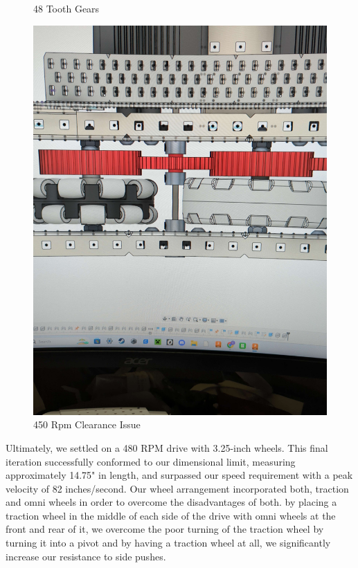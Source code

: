 \begin{figure} [htb!]
\begin{minipage}{.5\textwidth}
        \caption{48 Tooth Gears}
        \label{fig:48t-gears-=-too-long}
    \end{minipage}
    \begin{minipage}{.5\textwidth}
        \centering
        \includegraphics[width=.8\linewidth]{images/450 on 3.25 issue.jpg}
        \caption{450 Rpm Clearance Issue}
        \label{fig:450-on-3.25-issue}
    \end{minipage}
\end{figure}
Ultimately, we settled on a 480 RPM drive with 3.25-inch wheels. This final iteration successfully conformed to our dimensional limit, measuring approximately 14.75" in length, and surpassed our speed requirement with a peak velocity of 82 inches/second. Our wheel arrangement incorporated both, traction and omni wheels in order to overcome the disadvantages of both. by placing a traction wheel in the middle of each side of the drive with omni wheels at the front and rear of it, we overcome the poor turning of the traction wheel by turning it into a pivot and by having a traction wheel at all, we significantly increase our resistance to side pushes. 
\pagebreak
